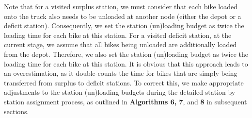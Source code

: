 Note that for a visited surplus station, we must consider that each bike loaded onto the truck also
needs to be unloaded at another node (either the depot or a deficit station). Consequently, we set
the station (un)loading budget as twice the loading time for each bike at this station. For a
visited deficit station, at the current stage, we assume that all bikes being unloaded are
additionally loaded from the depot. Therefore, we also set the station (un)loading budget as twice
the loading time for each bike at this station. It is obvious that this approach leads to an
overestimation, as it double-counts the time for bikes that are simply being transferred from
surplus to deficit stations. To correct this, we make appropriate adjustments to the station
(un)loading budgets during the detailed station-by-station assignment process, as outlined in
\textbf{Algorithms 6, 7}, and \textbf{8} in subsequent sections.
